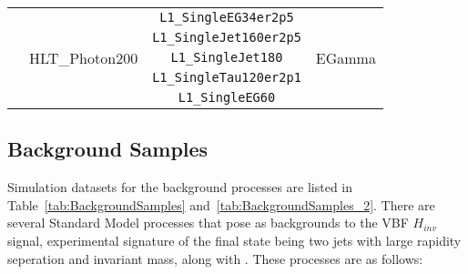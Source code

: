 \begin{table}[h]
\begin{tabular}{l l c c}
                               & \multirow{5}{*}{HLT\_Photon200}                           & \texttt{L1\_SingleEG34er2p5}    & \multirow{5}{*}{EGamma}       \\
                               &                                                           & \texttt{L1\_SingleJet160er2p5}  &                               \\
                               &                                                           & \texttt{L1\_SingleJet180}       &                               \\
                               &                                                           & \texttt{L1\_SingleTau120er2p1}  &                               \\
                               &                                                           & \texttt{L1\_SingleEG60}         &                               \\\hline

        \hline\hline %
    \end{tabular}

    \label{tab:triggers}
\end{table}

\subsection{Background Samples}


Simulation datasets for the background processes are listed in
Table~\ref{tab:BackgroundSamples} and~\ref{tab:BackgroundSamples_2}.
There are several Standard Model processes that pose as backgrounds to the VBF $H_{inv}$ signal, experimental signature of the
final state being two jets with large rapidity seperation and invariant mass, along with \ptmiss.
These processes are as follows:

